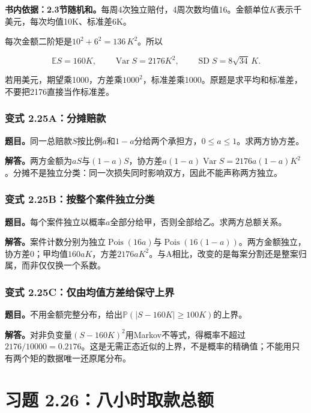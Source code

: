 \documentclass[12pt,a4paper,UTF8,fontset=fandol]{ctexart}
\begin{document}
\textbf{书内依据：2.3节随机和。}每周4次独立赔付，4周次数均值16。金额单位\(K\)表示千美元，每次均值10K、标准差6K。

每次金额二阶矩是\(10^2+6^2=136\,K^2\)。所以

\[\boxed{\mathbb ES=160K,\qquad
\operatorname{Var}S=2176K^2,\qquad
\operatorname{SD}S=8\sqrt{34}\,K.}\]

若用美元，期望乘1000，方差乘\(1000^2\)，标准差乘1000。原题是求平均和标准差，不要把2176直接当作标准差。

\subsubsection{变式
2.25A：分摊赔款}\label{ux53d8ux5f0f-2.25aux5206ux644aux8d54ux6b3e}

\textbf{题目。}同一总赔款\(S\)按比例\(a\)和\(1-a\)分给两个承担方，\(0\le a\le1\)。求两方协方差。

\textbf{解答。}两方金额为\(aS\)与\((1-a)S\)，协方差\(a(1-a)\operatorname{Var}S=2176a(1-a)K^2\)。分摊不是独立分类：同一次损失同时影响双方，因此不能声称两方独立。

\subsubsection{变式
2.25B：按整个案件独立分类}\label{ux53d8ux5f0f-2.25bux6309ux6574ux4e2aux6848ux4ef6ux72ecux7acbux5206ux7c7b}

\textbf{题目。}每个案件独立以概率\(a\)全部分给甲，否则全部给乙。求两方总额关系。

\textbf{解答。}案件计数分别为独立\(\operatorname{Pois}(16a)\)与\(\operatorname{Pois}(16(1-a))\)。两方金额独立，协方差0；甲均值\(160aK\)，方差\(2176aK^2\)。与A相比，改变的是每案分割还是整案归属，而非仅仅换一个系数。

\subsubsection{变式
2.25C：仅由均值方差给保守上界}\label{ux53d8ux5f0f-2.25cux4ec5ux7531ux5747ux503cux65b9ux5deeux7ed9ux4fddux5b88ux4e0aux754c}

\textbf{题目。}不用金额完整分布，给出\(\mathbb P(|S-160K|\ge100K)\)的上界。

\textbf{解答。}对非负变量\((S-160K)^2\)用Markov不等式，得概率不超过\(2176/10000=0.2176\)。这是无需正态近似的上界，不是概率的精确值；不能用只有两个矩的数据唯一还原尾分布。

\section{习题
2.26：八小时取款总额}\label{ux4e60ux9898-2.26ux516bux5c0fux65f6ux53d6ux6b3eux603bux989d}
\end{document}
